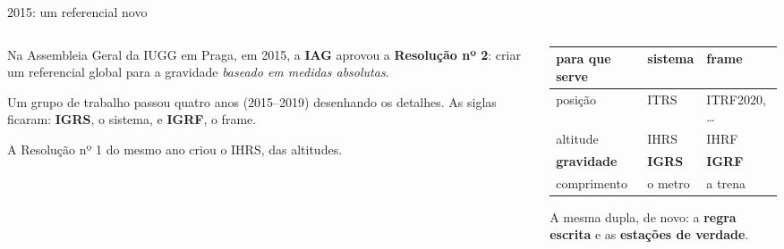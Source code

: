 \documentclass[aspectratio=169,11pt]{beamer}
\newcommand{\bnum}[1]{\textbf{\textcolor{mTeal}{#1}}}
\newcommand{\sist}[1]{\textcolor{corIdeal}{\textbf{#1}}}
\newcommand{\fram}[1]{\textcolor{corMedido}{\textbf{#1}}}
\begin{document}
\begin{frame}{2015: um referencial novo}
  \begin{columns}[T]
    \begin{column}{0.46\textwidth}
      Na Assembleia Geral da IUGG em Praga, em 2015, a \textbf{IAG} aprovou a
      \bnum{Resolução nº 2}: criar um referencial global para a gravidade \emph{baseado em
      medidas absolutas}.
      \medskip

      Um grupo de trabalho passou quatro anos (2015--2019) desenhando os detalhes. As
      siglas ficaram: \sist{IGRS}, o sistema, e \fram{IGRF}, o frame.
      \medskip

      {\small A Resolução nº 1 do mesmo ano criou o IHRS, das altitudes.}
    \end{column}
    \begin{column}{0.50\textwidth}
      \centering
      \small
      \renewcommand{\arraystretch}{1.4}
      \begin{tabular}{lll}
        \toprule
        para que serve & \sist{sistema} & \fram{frame} \\
        \midrule
        posição & ITRS & ITRF2020, \ldots \\
        altitude & IHRS & IHRF \\
        \textbf{gravidade} & \textbf{IGRS} & \textbf{IGRF} \\
        comprimento & o metro & a trena \\
        \bottomrule
      \end{tabular}
      \medskip

      {\small A mesma dupla, de novo: a \sist{regra escrita} e as \fram{estações de
      verdade}.}
    \end{column}
  \end{columns}
\end{frame}
\end{document}
